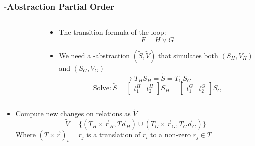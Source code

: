 \begin{frame}[t]
	\frametitle{\qvasr-Abstraction Partial Order}
	\begin{columns}
		\begin{column}{0.4\textwidth}
			\begin{figure}[h]
				\vspace*{0.5cm}
				\resizebox{0.6\textwidth}{!}{}
				\vspace{-0.5cm}
			\end{figure}
		\end{column} \pause
		\begin{column}{0.6\textwidth}
			\begin{itemize}
				\item The transition formula of the loop: 
				\begin{equation*}
					F = H \lor G
				\end{equation*}
				\pause
				\item We need a \qvasr-abstraction $(\tilde{S}, \tilde{V})$ that simulates both $(S_H, V_H)$ and $(S_G, V_G)$ 
				\pause
				\begin{equation*}
					\rightarrow T_HS_H = \tilde{S} = T_GS_G 
				\end{equation*}
				\pause
				\begin{equation*}
					\text{Solve:}\ \tilde{S} = \begin{bmatrix} t^{H}_1 & t^{H}_2  \end{bmatrix} S_H  = \begin{bmatrix} t^{G}_1 & t^{G}_2\end{bmatrix} S_G
				\end{equation*}
			\end{itemize}
		\end{column}
	\end{columns}
	\pause
	\vspace{0.5cm}
	\begin{itemize}
		\item Compute new changes on relations as $\tilde{V}$
		\begin{equation*}
			\tilde{V} = \{(T_H \times \vec{r}_H, T\vec{a}_H) \cup (T_G\times \vec{r}_G, T_G\vec{a}_G)\}
		\end{equation*}
		Where $(T \times \vec{r})_i = r_j$ is a translation of $r_i$ to a non-zero $r_j \in T$
	\end{itemize}
\end{frame}
